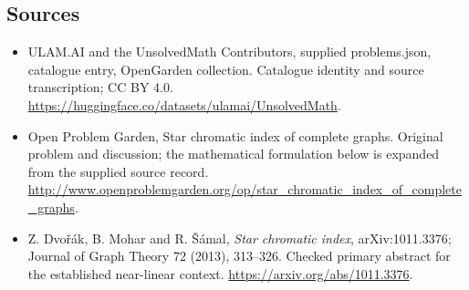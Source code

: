 \documentclass[11pt,a4paper]{article}
\begin{document}
\subsection{Sources}
\begin{itemize}
\item[S1] ULAM.AI and the UnsolvedMath Contributors, supplied problems.json, catalogue entry, OpenGarden collection. Catalogue identity and source transcription; CC BY 4.0.
\url{https://huggingface.co/datasets/ulamai/UnsolvedMath}.
\item[S2] Open Problem Garden, Star chromatic index of complete graphs. Original problem and discussion; the mathematical formulation below is expanded from the supplied source record.
\url{http://www.openproblemgarden.org/op/star_chromatic_index_of_complete_graphs}.
\item[R1] Z. Dvořák, B. Mohar and R. Šámal, \emph{Star chromatic index}, arXiv:1011.3376; Journal of Graph Theory 72 (2013), 313--326. Checked primary abstract for the established near-linear context.
\url{https://arxiv.org/abs/1011.3376}.
\end{itemize}
\end{document}
